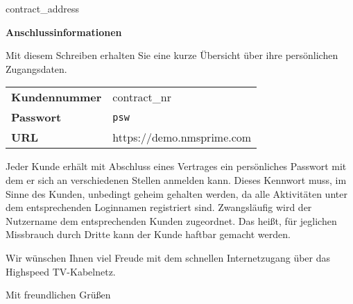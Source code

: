 \documentclass[version=last, fontsize=10pt, fromlogo=true, refline=wide, fromaddress=false, enlargefirstpage=true, numericaldate=true]{scrlttr2}
\begin{document}
	\begin{letter}{{contract\_address}}
		\opening{\textbf{\Large{Anschlussinformationen}}}


		Mit diesem Schreiben erhalten Sie eine kurze Übersicht über ihre persönlichen Zugangsdaten. %

		\par

		\begin{flushleft}
			\begin{small}
				\renewcommand{\arraystretch}{1.1}
				\begin{tabular}{@{}l l}
					\textbf{Kundennummer} & {contract\_nr}\\
					\textbf{Passwort} & \texttt{{psw}}\\
					\textbf{URL} & https://demo.nmsprime.com
				\end{tabular}
			\end{small}
		\end{flushleft}

		\par
		\begin{flushleft}
		Jeder Kunde erhält mit Abschluss eines Vertrages ein persönliches Passwort mit dem er sich an verschiedenen Stellen anmelden kann. Dieses Kennwort muss, im Sinne des Kunden, unbedingt geheim gehalten werden, da alle Aktivitäten unter dem entsprechenden Loginnamen registriert sind. Zwangsläufig wird der Nutzername dem entsprechenden Kunden zugeordnet. Das heißt, für jeglichen Missbrauch durch Dritte kann der Kunde haftbar gemacht werden.
		\end{flushleft}
		\par

		\begin{flushleft}
		Wir wünschen Ihnen viel Freude mit dem schnellen Internetzugang über das Highspeed TV-Kabelnetz.
		\end{flushleft}

		\par

		\begin{flushleft}
		Mit freundlichen Grüßen
		\end{flushleft}


	\end{letter}
\end{document}
